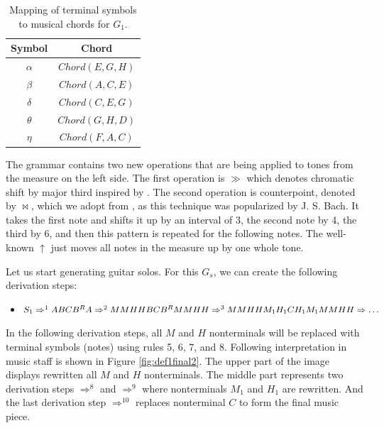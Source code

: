 \begin{table}[h]
\centering
\begin{tabular}{c|c}
Symbol & Chord \\
\hline
$\alpha$ & $Chord(E,G,H)$ \\
$\beta$ & $Chord(A,C,E)$ \\
$\delta$ & $Chord(C,E,G)$ \\
$\theta$ & $Chord(G,H,D)$ \\
$\eta$ & $Chord(F,A,C)$ \\
\end{tabular}
\label{Tb3}
\caption{Mapping of terminal symbols to musical chords for $G_1$.}
\end{table}

The grammar contains two new operations that are being applied to tones from the measure on the left side. The first operation is $\gg$ which denotes chromatic shift by major third inspired by \cite{kim2007liszt}. The second operation is counterpoint, denoted by 
$\bowtie$, which we adopt from \cite{yearsley2002bach}, as this technique was popularized by J. S. Bach. It takes the first note and shifts it up by an interval of 3, the second note by 4, the third by 6, and then this pattern is repeated for the following notes. The well-known $\uparrow$ just moves all notes in the measure up by one whole tone.

Let us start generating guitar solos. For this $G_s$, we can create the following derivation steps:
\begin{itemize}
    \item{$S_1 \Rightarrow^1 ABCB^{R}A \Rightarrow^2 MMHHBCB^{R}MMHH \Rightarrow^3 MMHHM_1H_1CH_1M_1MMHH
    \\ \Rightarrow \hdots$}
\end{itemize}

In the following derivation steps, all $M$ and $H$ nonterminals will be replaced with terminal symbols (notes) using rules 5, 6, 7, and 8. Following interpretation in music staff is shown in Figure \ref{fig:def1final2}. The upper part of the image displays rewritten all $M$ and $H$ nonterminals. The middle part represents two derivation steps $\Rightarrow^8$ and $\Rightarrow^9$ where nonterminals $M_1$ and $H_1$ are rewritten. And the last derivation step $\Rightarrow^{10}$ replaces nonterminal $C$ to form the final music piece.

